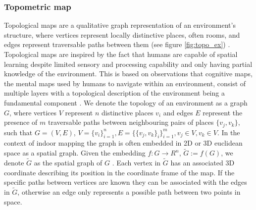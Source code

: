 \subsubsection{Topometric map}
Topological maps are a qualitative graph representation of an environment's structure, where vertices represent locally distinctive places, often rooms, and edges represent traversable paths between them  (see figure \ref{fig:topo_ex}) \citep{thrun_learning_1998,kuipers_robust_1988}. Topological maps are inspired by the fact that humans are capable of spatial learning despite limited sensory and processing capability and only having partial knowledge of the environment. This is based on observations that cognitive maps, the mental maps used by humans to navigate within an environment, consist of multiple layers with a topological description of the environment being a fundamental component \citep{kuipers_robust_1988,kuipers_modeling_1978}. We denote the topology of an environment as a graph \(G\), where vertices \(V\) represent \(n\) distinctive places \(v_i\) and edges \(E\) represent the presence of \(m\) traversable paths between neighbouring pairs of places \(\{v_j,v_k\}\), such that \(G=(V, E)\), \(V=\{v_i\}_{i=1}^n, E=\{\{v_j,v_k\}_i\}_{i=1}^m, v_j \in V, v_k \in V\). In the context of indoor mapping the graph is often embedded in 2D or 3D euclidean space as a spatial graph. Given the embedding \(f : G \rightarrow R^n\), \( \widetilde{G}:=f(G)\), we denote \(\widetilde{G}\) as the spatial graph of \(G\) \citep{kobayashi_spatial_1994}. Each vertex in \(\widetilde{G}\) has an associated 3D coordinate describing its position in the coordinate frame of the map. If the specific paths between vertices are known they can be associated with the edges in \(\widetilde{G}\), otherwise an edge only represents a possible path between two points in space.